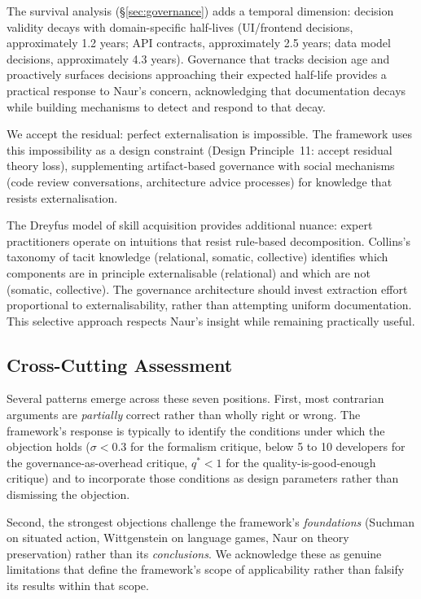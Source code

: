 \documentclass[11pt, a4paper, logo, copyright]{googledeepmind}
\begin{document}
The survival analysis (\S\ref{sec:governance}) adds a temporal dimension: decision validity decays with domain-specific half-lives (UI/frontend decisions, approximately 1.2 years; API contracts, approximately 2.5 years; data model decisions, approximately 4.3 years). Governance that tracks decision age and proactively surfaces decisions approaching their expected half-life provides a practical response to Naur's concern, acknowledging that documentation decays while building mechanisms to detect and respond to that decay.

We accept the residual: perfect externalisation is impossible. The framework uses this impossibility as a design constraint (Design Principle~11: accept residual theory loss), supplementing artifact-based governance with social mechanisms (code review conversations, architecture advice processes) for knowledge that resists externalisation.

The Dreyfus model of skill acquisition provides additional nuance: expert
practitioners operate on intuitions that resist rule-based decomposition.
Collins's taxonomy of tacit knowledge (relational, somatic, collective)
identifies which components are in principle externalisable (relational) and
which are not (somatic, collective).  The governance architecture should invest
extraction effort proportional to externalisability, rather than attempting
uniform documentation.  This selective approach respects Naur's insight while
remaining practically useful.


\subsection{Cross-Cutting Assessment}

Several patterns emerge across these seven positions.  First, most contrarian
arguments are \emph{partially} correct rather than wholly right or wrong.  The
framework's response is typically to identify the conditions under which the
objection holds ($\sigma < 0.3$ for the formalism critique, below 5 to 10
developers for the governance-as-overhead critique, $q^* < 1$ for the
quality-is-good-enough critique) and to incorporate those conditions as design
parameters rather than dismissing the objection.

Second, the strongest objections challenge the framework's \emph{foundations}
(Suchman on situated action, Wittgenstein on language games, Naur on
theory preservation) rather than its \emph{conclusions}.  We acknowledge these
as genuine limitations that define the framework's scope of applicability rather
than falsify its results within that scope.
\end{document}

